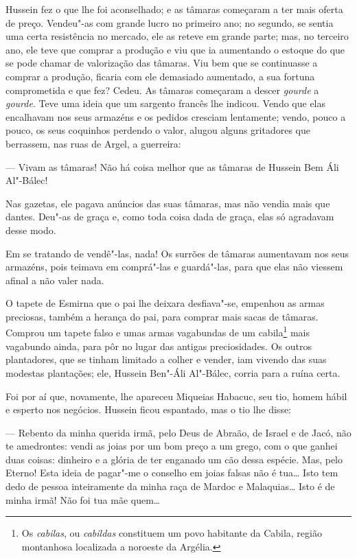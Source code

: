 Hussein fez o que lhe foi aconselhado; e as tâmaras começaram a ter mais
oferta de preço. Vendeu"-as com grande lucro no primeiro ano; no segundo,
se sentia uma certa resistência no mercado, ele as reteve em grande
parte; mas, no terceiro ano, ele teve que comprar a produção e viu que
ia aumentando o estoque do que se pode chamar de valorização das
tâmaras. Viu bem que se continuasse a comprar a produção, ficaria com
ele demasiado aumentado, a sua fortuna comprometida e que fez? Cedeu. As
tâmaras começaram a descer \emph{gourde} a \emph{gourde}. Teve uma ideia
que um sargento francês lhe indicou. Vendo que elas encalhavam nos seus
armazéns e os pedidos cresciam lentamente; vendo, pouco a pouco, os seus
coquinhos perdendo o valor, alugou alguns gritadores que berrassem, nas
ruas de Argel, a guerreira:

--- Vivam as tâmaras! Não há coisa melhor que as tâmaras de Hussein Bem
Áli Al"-Bálec!

Nas gazetas, ele pagava anúncios das suas tâmaras, mas não vendia mais
que dantes. Deu"-as de graça e, como toda coisa dada de graça, elas só
agradavam desse modo.

Em se tratando de vendê"-las, nada! Os surrões de tâmaras aumentavam nos
seus armazéns, pois teimava em comprá"-las e guardá"-las, para que elas
não viessem afinal a não valer nada.

O tapete de Esmirna que o pai lhe deixara desfiava"-se, empenhou as armas
preciosas, também a herança do pai, para comprar mais sacas de tâmaras.
Comprou um tapete falso e umas armas vagabundas de um cabila\footnote{Os
  \emph{cabilas}, ou \emph{cabildas} constituem um povo habitante da
  Cabila, região montanhosa localizada a noroeste da Argélia.} mais
vagabundo ainda, para pôr no lugar das antigas preciosidades. Os outros
plantadores, que se tinham limitado a colher e vender, iam vivendo das
suas modestas plantações; ele, Hussein Ben"-Áli Al"-Bálec, corria para a
ruína certa.

Foi por aí que, novamente, lhe apareceu Miqueias Habacuc, seu tio, homem
hábil e esperto nos negócios. Hussein ficou espantado, mas o tio lhe
disse:

--- Rebento da minha querida irmã, pelo Deus de Abraão, de Israel e de
Jacó, não te amedrontes: vendi as joias por um bom preço a um grego, com
o que ganhei duas coisas: dinheiro e a glória de ter enganado um cão
dessa espécie. Mas, pelo Eterno! Esta ideia de pagar"-me o conselho em
joias falsas não é tua\ldots{} Isto tem dedo de pessoa inteiramente da minha
raça de Mardoc e Malaquias\ldots{} Isto é de minha irmã! Não foi tua mãe
quem\ldots{}

